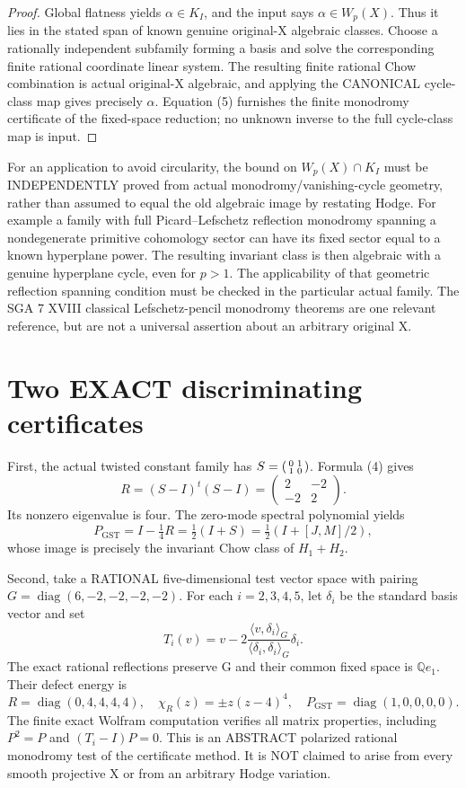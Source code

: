 \documentclass[11pt]{article}
\begin{document}
\begin{proof}
Global flatness yields $\alpha\in K_I$,
and the input says $\alpha\in W_p(X)$.
Thus it lies in the stated span of known
genuine original-X algebraic classes.
Choose a rationally independent subfamily
forming a basis and solve the corresponding
finite rational coordinate linear system.
The resulting finite rational Chow
combination is actual original-X algebraic,
and applying the CANONICAL cycle-class
map gives precisely $\alpha$. Equation
(5) furnishes the finite monodromy
certificate of the fixed-space reduction;
no unknown inverse to the full cycle-class
map is input.
\end{proof}

For an application to avoid circularity,
the bound on $W_p(X)\cap K_I$ must be
INDEPENDENTLY proved from actual
monodromy/vanishing-cycle geometry,
rather than assumed to equal the old
algebraic image by restating Hodge.
For example a family with full
Picard--Lefschetz reflection monodromy
spanning a nondegenerate primitive
cohomology sector can have its fixed
sector equal to a known hyperplane
power. The resulting invariant class is
then algebraic with a genuine hyperplane
cycle, even for $p>1$.
The applicability of that geometric
reflection spanning condition must be
checked in the particular actual family.
The SGA 7 XVIII classical Lefschetz-pencil
monodromy theorems are one relevant
reference, but are not a universal
assertion about an arbitrary original X.

\section{Two EXACT discriminating certificates}
First, the actual twisted constant family
has $S=\begin{psmallmatrix}0&1\\1&0\end{psmallmatrix}$.
Formula (4) gives
\[
R=(S-I)^t(S-I)
=\begin{pmatrix}2&-2\\-2&2\end{pmatrix}.
\]
Its nonzero eigenvalue is four.
The zero-mode spectral polynomial yields
\[
\boxed{P_{\mathrm{GST}}=I-\tfrac14R
 =\tfrac12(I+S)
 =\tfrac12(I+[J,M]/2),}
\tag{8}
\]
whose image is precisely the invariant
Chow class of $H_1+H_2$.

Second, take a RATIONAL five-dimensional
test vector space with pairing
$G=\operatorname{diag}(6,-2,-2,-2,-2)$.
For each $i=2,3,4,5$, let $\delta_i$
be the standard basis vector and set
\[
T_i(v)=v-
  2\frac{\langle v,\delta_i\rangle_G}
          {\langle\delta_i,\delta_i\rangle_G}
    \delta_i .
\]
The exact rational reflections preserve G
and their common fixed space is
$\mathbb Q e_1$. Their defect energy is
\[
R=\operatorname{diag}(0,4,4,4,4),\quad
\chi_R(z)=\pm z(z-4)^4,\quad
\boxed{P_{\mathrm{GST}}=
 \operatorname{diag}(1,0,0,0,0).}
\tag{9}
\]
The finite exact Wolfram computation verifies
all matrix properties, including
$P^2=P$ and $(T_i-I)P=0$.
This is an ABSTRACT polarized rational
monodromy test of the certificate method.
It is NOT claimed to arise from every
smooth projective X or from an
arbitrary Hodge variation.
\end{document}
